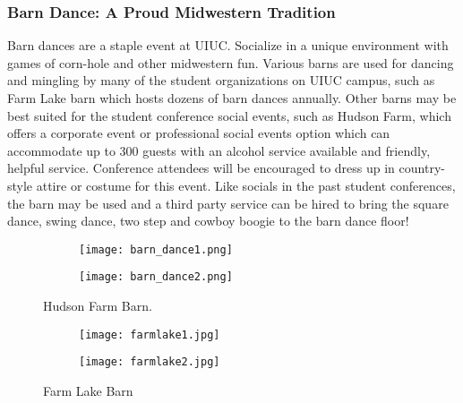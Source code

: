 \subsubsection{Barn Dance: A Proud Midwestern Tradition}
Barn dances are a staple event at UIUC. Socialize in a unique environment with games of corn-hole and other midwestern fun. Various barns are used for dancing and mingling by many of the student organizations on UIUC campus, such as Farm Lake barn which hosts dozens of barn dances annually. Other barns may be best suited for the student conference social events, such as Hudson Farm, which offers a corporate event or professional social events option which can accommodate up to 300 guests with an alcohol service available and friendly, helpful service. Conference attendees will be encouraged to dress up in country-style attire or costume for this event. Like socials in the past student conferences, the barn may be used and a third party service can be hired to bring the square dance, swing dance, two step and cowboy boogie to the barn dance floor! 
\vspace{0.5cm}\newline
\begin{figure}[H]
	\centering
	\begin{subfigure}{0.4\textwidth}
		\centering
		\texttt{[image: barn\_dance1.png]}
	\end{subfigure}%
	\begin{subfigure}{0.4\textwidth}
		\centering
		\texttt{[image: barn\_dance2.png]}
	\end{subfigure}	
	\caption{Hudson Farm Barn.}	
\end{figure} 
\begin{figure}[H]
	\centering
	\begin{subfigure}{0.4\textwidth}
		\centering
		\texttt{[image: farmlake1.jpg]}
	\end{subfigure}%
	\begin{subfigure}{0.4\textwidth}
		\centering
		\texttt{[image: farmlake2.jpg]}
	\end{subfigure}	
	\caption{Farm Lake Barn}	
\end{figure} 

